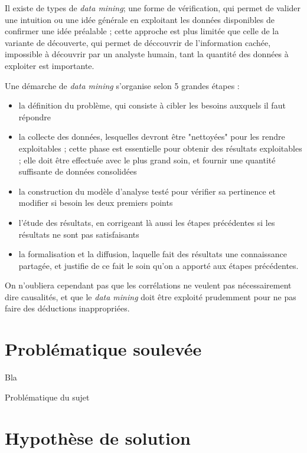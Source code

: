Il existe de types de \textit{data mining}; une forme de vérification, qui permet de valider une intuition ou une idée générale en exploitant les données disponibles de confirmer une idée préalable ; cette approche est plus limitée que celle de la variante de découverte, qui permet de déccouvrir de l'information cachée, impossible à découvrir par un analyste humain, tant la quantité des données à exploiter est importante. 

Une démarche de \textit{data mining} s'organise selon 5 grandes étapes : 
\begin{itemize}
\item la définition du problème, qui consiste à cibler les besoins auxquels il faut répondre
\item la collecte des données, lesquelles devront être "nettoyées" pour les rendre exploitables ; cette phase est essentielle pour obtenir des résultats exploitables ; elle doit être effectuée avec le plus grand soin, et fournir une quantité suffisante de données consolidées
\item la construction du modèle d'analyse testé pour vérifier sa pertinence et modifier si besoin les deux premiers points
\item l'étude des résultats, en corrigeant là aussi les étapes précédentes si les résultats ne sont pas satisfaisants
\item la formalisation et la diffusion, laquelle fait des résultats une connaissance partagée, et justifie de ce fait le soin qu'on a apporté aux étapes précédentes. 

\end{itemize}

On n'oubliera cependant pas que les corrélations ne veulent pas nécessairement dire causalités, et que le \textit{data mining} doit être exploité prudemment pour ne pas faire des déductions inappropriées. 




\section{Problématique soulevée}

Bla

\begin{center}
Problématique du sujet
\end{center}

\section{Hypothèse de solution}

